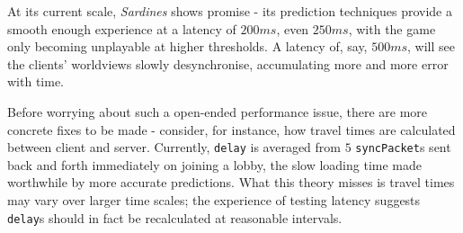 \documentclass[a4paper, 9pt]{article}
\begin{document}
\begin{flushleft}
\vspace{5pt}\noindent
At its current scale, \textit{Sardines} shows promise - its prediction techniques provide a smooth enough experience at a latency of $200ms$, even $250ms$, with the game only becoming unplayable at higher thresholds. A latency of, say, $500ms$, will see the clients' worldviews slowly desynchronise, accumulating more and more error with time. %


\vspace{5pt}\noindent
Before worrying about such a open-ended performance issue, there are more concrete fixes to be made - consider, for instance, how travel times are calculated between client and server. Currently, \texttt{delay} is averaged from $5$ \texttt{syncPacket}s sent back and forth immediately on joining a lobby, the slow loading time made worthwhile by more accurate predictions. What this theory misses is travel times may vary over larger time scales; the experience of testing latency suggests \texttt{delay}s should in fact be recalculated at reasonable intervals. %



\end{flushleft}
\end{document}
